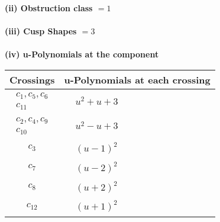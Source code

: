 \documentclass[1p]{elsarticle_modified}
\theoremstyle{definition}
\begin{document}
\flushleft \textbf{(ii) Obstruction class $= 1$}\\~\\
\flushleft \textbf{(iii) Cusp Shapes $= 3$}\\~\\
\newpage\renewcommand{\arraystretch}{1}
\flushleft \textbf{(iv) u-Polynomials at the component}\newline \\
\begin{tabular}{m{50pt}|m{274pt}}
Crossings & \hspace{64pt}u-Polynomials at each crossing \\
\hline $$\begin{aligned}c_{1},c_{5},c_{6}\\c_{11}\end{aligned}$$&$\begin{aligned}
&u^2+u+3
\end{aligned}$\\
\hline $$\begin{aligned}c_{2},c_{4},c_{9}\\c_{10}\end{aligned}$$&$\begin{aligned}
&u^2- u+3
\end{aligned}$\\
\hline $$\begin{aligned}c_{3}\end{aligned}$$&$\begin{aligned}
&(u-1)^2
\end{aligned}$\\
\hline $$\begin{aligned}c_{7}\end{aligned}$$&$\begin{aligned}
&(u-2)^2
\end{aligned}$\\
\hline $$\begin{aligned}c_{8}\end{aligned}$$&$\begin{aligned}
&(u+2)^2
\end{aligned}$\\
\hline $$\begin{aligned}c_{12}\end{aligned}$$&$\begin{aligned}
&(u+1)^2
\end{aligned}$\\
\hline
\end{tabular}\\~\\
\end{document}
